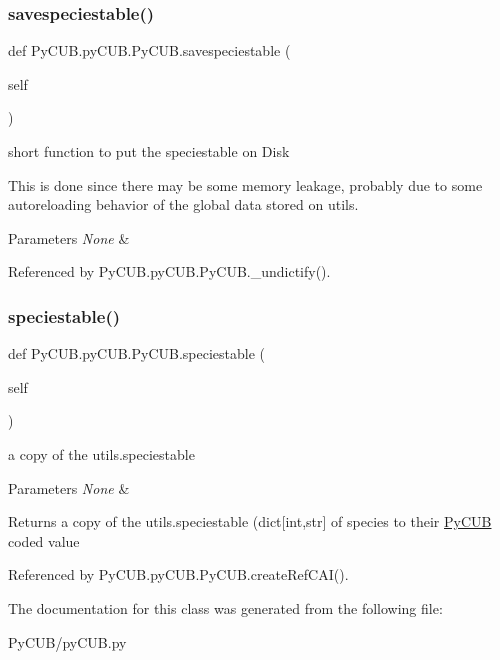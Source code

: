 \subsubsection{\texorpdfstring{savespeciestable()}{savespeciestable()}}
{\footnotesize\ttfamily def Py\+C\+U\+B.\+py\+C\+U\+B.\+Py\+C\+U\+B.\+savespeciestable (\begin{DoxyParamCaption}\item[{}]{self }\end{DoxyParamCaption})}



short function to put the speciestable on Disk 

This is done since there may be some memory leakage, probably due to some autoreloading behavior of the global data stored on utils.


\begin{DoxyParams}{Parameters}
{\em None} & \\
\hline
\end{DoxyParams}


Referenced by Py\+C\+U\+B.\+py\+C\+U\+B.\+Py\+C\+U\+B.\+\_\+undictify().

\mbox{\label{class_py_c_u_b_1_1py_c_u_b_1_1_py_c_u_b_af3e280c265200f13946e4bdcb4cd9dd0}} 
\subsubsection{\texorpdfstring{speciestable()}{speciestable()}}
{\footnotesize\ttfamily def Py\+C\+U\+B.\+py\+C\+U\+B.\+Py\+C\+U\+B.\+speciestable (\begin{DoxyParamCaption}\item[{}]{self }\end{DoxyParamCaption})}



a copy of the utils.\+speciestable 


\begin{DoxyParams}{Parameters}
{\em None} & \\
\hline
\end{DoxyParams}
\begin{DoxyReturn}{Returns}
a copy of the utils.\+speciestable (dict\mbox{[}int,str\mbox{]} of species to their \mbox{\hyperlink{class_py_c_u_b_1_1py_c_u_b_1_1_py_c_u_b}{Py\+C\+UB}} coded value 
\end{DoxyReturn}


Referenced by Py\+C\+U\+B.\+py\+C\+U\+B.\+Py\+C\+U\+B.\+create\+Ref\+C\+A\+I().



The documentation for this class was generated from the following file\+:\begin{DoxyCompactItemize}
\item 
Py\+C\+U\+B/py\+C\+U\+B.\+py\end{DoxyCompactItemize}
